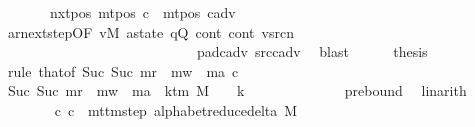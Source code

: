 \begin{isabellebody}
\ \ \ \ \ \ \ nxt{\isacharunderscore}{\kern0pt}pos{\isacharcolon}{\kern0pt}\ {\isachardoublequoteopen}mt{\isacharunderscore}{\kern0pt}pos\ c{\isacharprime}{\kern0pt}{\isacharprime}{\kern0pt}\ {\isacharequal}{\kern0pt}\ mt{\isacharunderscore}{\kern0pt}pos\ c{\isacharunderscore}{\kern0pt}adv{\isachardoublequoteclose}\isanewline
\ \ \ \ \ \ \isamarkupfalse%
\ ar{\isacharunderscore}{\kern0pt}next{\isacharunderscore}{\kern0pt}step{\isacharbrackleft}{\kern0pt}OF\ vM\ a{\isacharunderscore}{\kern0pt}state\ q{\isacharprime}{\kern0pt}Q\ cont{\isacharparenleft}{\kern0pt}{}{\isacharparenright}{\kern0pt}\ cont{\isacharparenleft}{\kern0pt}{}{\isacharparenright}{\kern0pt}\ vsrc{\isacharunderscore}{\kern0pt}n\isanewline
\ \ \ \ \ \ \ \ \ \ \ \ \ \ \ \ \ \ \ \ \ \ \ \ \ \ \ \ pad{\isacharunderscore}{\kern0pt}cadv\ src{\isacharunderscore}{\kern0pt}cadv{\isacharbrackright}{\kern0pt}\ \isamarkupfalse%
\ blast\isanewline
\ \ \ \ \isamarkupfalse%
\ thesis\isanewline
\ \ \ \ \isamarkupfalse%
\ {\isacharparenleft}{\kern0pt}rule\ that{\isacharbrackleft}{\kern0pt}of\ {\isachardoublequoteopen}Suc\ {\isacharparenleft}{\kern0pt}Suc\ m{\isacharunderscore}{\kern0pt}r\ {\isacharplus}{\kern0pt}\ m{\isacharunderscore}{\kern0pt}w\ {\isacharplus}{\kern0pt}\ m{\isacharunderscore}{\kern0pt}a{\isacharparenright}{\kern0pt}{\isachardoublequoteclose}\ c{\isacharprime}{\kern0pt}{\isacharprime}{\kern0pt}{\isacharbrackright}{\kern0pt}{\isacharparenright}{\kern0pt}\isanewline
\ \ \ \ \ \ \isamarkupfalse%
\ {\isachardoublequoteopen}Suc\ {\isacharparenleft}{\kern0pt}Suc\ m{\isacharunderscore}{\kern0pt}r\ {\isacharplus}{\kern0pt}\ m{\isacharunderscore}{\kern0pt}w\ {\isacharplus}{\kern0pt}\ m{\isacharunderscore}{\kern0pt}a{\isacharparenright}{\kern0pt}\ {\isasymle}\ k{\isacharunderscore}{\kern0pt}tm\ M\ {\isacharasterisk}{\kern0pt}\ {\isacharparenleft}{\kern0pt}{}\ {\isacharasterisk}{\kern0pt}\ {\isacharquery}{\kern0pt}k\ {\isacharplus}{\kern0pt}\ {}{\isacharparenright}{\kern0pt}\ {\isacharplus}{\kern0pt}\ {}{\isachardoublequoteclose}\isanewline
\ \ \ \ \ \ \ \ \isamarkupfalse%
\ pre{\isacharunderscore}{\kern0pt}bound\ \isamarkupfalse%
\ linarith\isanewline
\ \ \ \ \ \ \isamarkupfalse%
\ {\isachardoublequoteopen}{\isacharparenleft}{\kern0pt}c{\isacharprime}{\kern0pt}{\isacharcomma}{\kern0pt}\ c{\isacharprime}{\kern0pt}{\isacharprime}{\kern0pt}{\isacharparenright}{\kern0pt}\ {\isasymin}\ {\isacharparenleft}{\kern0pt}mttm{\isacharunderscore}{\kern0pt}step\ {\isacharparenleft}{\kern0pt}alphabet{\isacharunderscore}{\kern0pt}reduce{\isacharunderscore}{\kern0pt}delta\ M{\isacharparenright}{\kern0pt}{\isacharparenright}{\kern0pt}\isanewline

\end{isabellebody}

